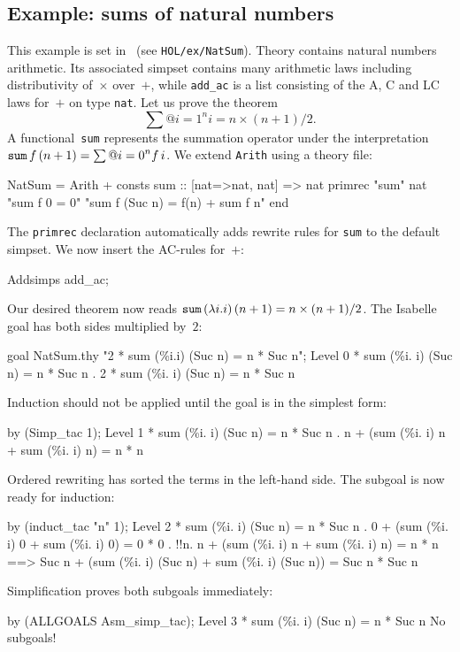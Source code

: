 \subsection{Example: sums of natural numbers}
This example is set in \HOL\ (see \texttt{HOL/ex/NatSum}).  Theory
 contains natural numbers arithmetic.  Its associated
simpset contains many arithmetic laws including distributivity
of~$\times$ over~$+$, while {\tt add_ac} is a list consisting of the
A, C and LC laws for~$+$ on type \texttt{nat}.  Let us prove the
theorem
\[ \sum@{i=1}^n i = n\times(n+1)/2. \]
%
A functional~{\tt sum} represents the summation operator under the
interpretation ${\tt sum} \, f \, (n + 1) = \sum@{i=0}^n f\,i$.  We
extend {\tt Arith} using a theory file:
\begin{ttbox}
NatSum = Arith +
consts sum     :: [nat=>nat, nat] => nat
primrec "sum" nat 
  "sum f 0 = 0"
  "sum f (Suc n) = f(n) + sum f n"
end
\end{ttbox}
The \texttt{primrec} declaration automatically adds rewrite rules for
\texttt{sum} to the default simpset.  We now insert the AC-rules for~$+$:
\begin{ttbox}
Addsimps add_ac;
\end{ttbox}
Our desired theorem now reads ${\tt sum} \, (\lambda i.i) \, (n+1) =
n\times(n+1)/2$.  The Isabelle goal has both sides multiplied by~$2$:
\begin{ttbox}
goal NatSum.thy "2 * sum (\%i.i) (Suc n) = n * Suc n";
{\out Level 0}
{ * sum (\%i. i) (Suc n) = n * Suc n}
{. 2 * sum (\%i. i) (Suc n) = n * Suc n}
\end{ttbox}
Induction should not be applied until the goal is in the simplest
form:
\begin{ttbox}
by (Simp_tac 1);
{\out Level 1}
{ * sum (\%i. i) (Suc n) = n * Suc n}
{. n + (sum (\%i. i) n + sum (\%i. i) n) = n * n}
\end{ttbox}
Ordered rewriting has sorted the terms in the left-hand side.  The
subgoal is now ready for induction:
\begin{ttbox}
by (induct_tac "n" 1);
{\out Level 2}
{ * sum (\%i. i) (Suc n) = n * Suc n}
{. 0 + (sum (\%i. i) 0 + sum (\%i. i) 0) = 0 * 0}
\ttbreak
{. !!n. n + (sum (\%i. i) n + sum (\%i. i) n) = n * n}
{\out           ==> Suc n + (sum (\%i. i) (Suc n) + sum (\%i. i) (Suc n)) =}
{\out               Suc n * Suc n}
\end{ttbox}
Simplification proves both subgoals immediately:
\begin{ttbox}
by (ALLGOALS Asm_simp_tac);
{\out Level 3}
{ * sum (\%i. i) (Suc n) = n * Suc n}
{\out No subgoals!}
\end{ttbox}
